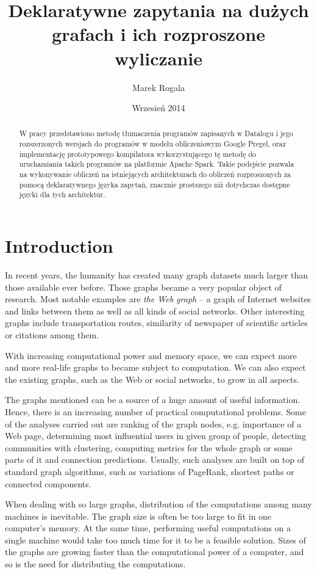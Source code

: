 \documentclass{pracamgr}
\author{Marek Rogala}
\title{Deklaratywne zapytania na dużych grafach i ich rozproszone wyliczanie}
\date{Wrzesień 2014}
\theoremstyle{plain}
\theoremstyle{definition}
\theoremstyle{remark}
\begin{document}
\maketitle

\begin{abstract}
W pracy przedstawiono metodę tłumaczenia programów zapisanych w Datalogu
i jego rozszerzonych wersjach do programów w modelu obliczeniowym Google Pregel,
oraz implementację prototypowego kompilatora wykorzystującego tę metodę do uruchamiania takich programów na platformie Apache Spark.
Takie podejście pozwala na wykonywanie obliczeń na istniejących architekturach do obliczeń rozproszonych
za pomocą deklaratywnego języka zapytań, znacznie prostszego niż dotychczas dostępne języki dla tych architektur.
\end{abstract}

\tableofcontents

\chapter*{Introduction}
In recent years, the humanity has created many graph datasets much larger than those available ever before.
Those graphs became a very popular object of research. Most notable examples are \emph{the Web graph} -- a graph of Internet websites and links between them as well as all kinds of social networks. Other interesting graphs include transportation routes, similarity of newspaper of scientific articles or citations among them.

With increasing computational power and memory space, we can expect more and more real-life graphs to became subject to computation. We can also expect the existing graphs, such as the Web or social networks, to grow in all aspects.

The graphs mentioned can be a source of a huge amount of useful information. Hence, there is an increasing number of practical computational problems.
Some of the analyses carried out are ranking of the graph nodes, e.g. importance of a Web page, determining most influential users in given group of people, detecting communities with clustering, computing metrics for the whole graph or some parts of it and connection predictions.
Usually, such analyses are built on top of standard graph algorithms, such as variations of PageRank, shortest paths or connected components.

When dealing with so large graphs, distribution of the computations among many machines is inevitable. The graph size is often be too large to fit in one computer's memory. At the same time, performing useful computations on a single machine would take too much time for it to be a feasible solution. Sizes of the graphs are growing faster than the computational power of a computer, and so is the need for distributing the computations.
\end{document}
